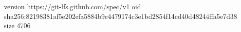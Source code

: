 version https://git-lfs.github.com/spec/v1
oid sha256:82198381af5e202efa5884b9c4479174c3e1bd2854f14cd40d48244ffa5e7d38
size 4706
